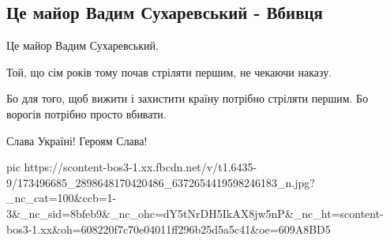  
 
 
 
 

\subsection{Це майор Вадим Сухаревський - Вбивця}
\label{sec:13_04_2021.fb.makarenko_oksana.1.major_vragi_vojna}

Це майор Вадим Сухаревський.

Той, що сім років тому почав стріляти першим, не чекаючи наказу.

Бо для того, щоб вижити і захистити країну потрібно стріляти першим. Бо ворогів потрібно просто вбивати.

Слава Україні! Героям Слава!

\ifcmt
  pic https://scontent-bos3-1.xx.fbcdn.net/v/t1.6435-9/173496685_2898648170420486_6372654419598246183_n.jpg?_nc_cat=100&ccb=1-3&_nc_sid=8bfeb9&_nc_ohc=dY5tNrDH5IkAX8jw5nP&_nc_ht=scontent-bos3-1.xx&oh=608220f7c70e04011ff296b25d5a5c41&oe=609A8BD5
\fi


